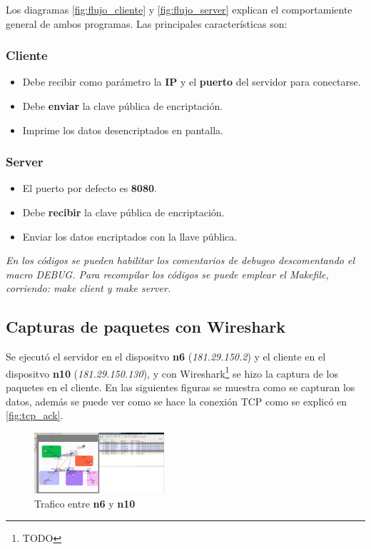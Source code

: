\documentclass[letterpaper, 10 pt, conference]{ieeeconf}  %
\begin{document}
Los diagramas \ref{fig:flujo_cliente} y \ref{fig:flujo_server} explican el comportamiente general de ambos programas. Las principales características son:

\subsubsection{Cliente}
\begin{itemize}
	\item Debe recibir como parámetro la \textbf{IP} y el \textbf{puerto} del servidor para conectarse.
	\item Debe \textbf{enviar} la clave pública de encriptación.
	\item Imprime los datos desencriptados en pantalla.
\end{itemize}

\subsubsection{Server}
\begin{itemize}
	\item El puerto por defecto es \textbf{8080}.
	\item Debe \textbf{recibir} la clave pública de encriptación.
	\item Enviar los datos encriptados con la llave pública.
\end{itemize}

\textit{En los códigos se pueden habilitar los comentarios de debugeo descomentando el macro DEBUG. Para recompilar los códigos se puede emplear el Makefile, corriendo: make client y make server.}

\subsection{Capturas de paquetes con Wireshark}

Se ejecutó el servidor en el dispositvo \textbf{n6} (\textit{181.29.150.2}) y el cliente en el dispositvo \textbf{n10} (\textit{181.29.150.130}), y con Wireshark\footnote{TODO} se hizo la captura de los paquetes en el cliente. En las siguientes figuras se muestra como se capturan los datos, además se puede ver como se hace la conexión TCP como se explicó en \ref{fig:tcp_ack}.

\begin{figure}[H]
	\centering
	\includegraphics[width=0.43\textwidth]{./Imagenes/captura_wireshark_n6_n10.png}
	\caption{Trafico entre \textbf{n6} y \textbf{n10}}
	\label{fig:wireshark_n6_n10}
\end{figure}
\end{document}
